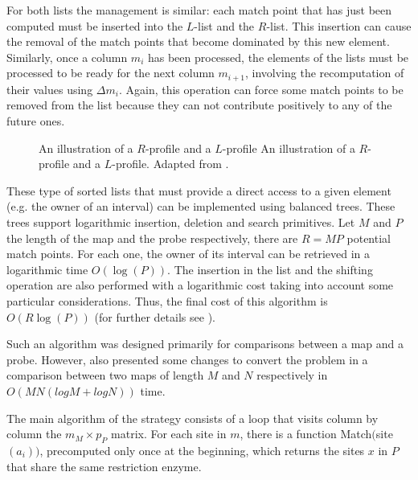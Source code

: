 {For both lists the management is similar: each match point that has just been computed must be inserted into the $L$-list and
the $R$-list. This insertion can cause the removal of the match points that become dominated by this new element. Similarly,
once a column $m_i$ has been processed, the elements of the lists must be processed to be ready for the next column $m_{i+1}$,
involving the recomputation of their values using $\Delta m_i$. Again, this operation can force some match points to be removed 
from the list because they can not contribute positively to any of the future ones.


\begin{figure}[t!]
\begin{center}
\setlength{\fboxsep}{0pt}
          {An illustration of a $R$-profile and a $L$-profile}%
          {An illustration of a $R$-profile and a $L$-profile.}%
          {Adapted from \citet{myers:1992a}.}
\end{center}
\end{figure}

These type of sorted lists that must provide a direct access to a given element (e.g. the owner of an interval)
can be implemented using balanced trees. These trees support logarithmic insertion, deletion and search primitives.
Let $M$ and $P$ the length of the map and the probe respectively, there are $R=MP$ potential match points. For each
one, the owner of its interval can be retrieved in a logarithmic time $O(\log(P))$. The insertion in the
list and the shifting operation are also performed with a logarithmic cost taking into account some particular
considerations. Thus, the final cost of this algorithm is $O(R\log(P))$  (for further details see \citet{myers:1992a}).

Such an algorithm was designed primarily for comparisons between a map and a probe. However, \citeauthor{myers:1992a}
also presented some changes to convert the problem in a comparison between two maps
of length $M$ and $N$ respectively in $O(MN(logM+logN))$ time.



The main algorithm of the \citet{myers:1992a} strategy consists of a loop that visits column
by column the $m_M \times p_P$ matrix. For each site in $m$, there is a function Match$($site$(a_i))$,
precomputed only once at the beginning, which returns the sites $x$ in $P$ that share the same 
restriction enzyme. 

}
